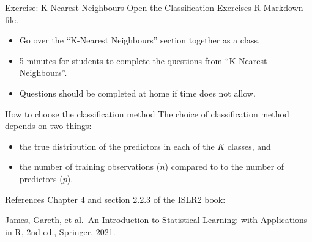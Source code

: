\documentclass[
  ignorenonframetext,
  aspectratio=169,
]{beamer}
\begin{document}
\begin{frame}{Exercise: K-Nearest Neighbours}
\protect\hypertarget{exercise-k-nearest-neighbours}{}
Open the Classification Exercises R Markdown file.

\begin{itemize}
\item
  Go over the ``K-Nearest Neighbours'' section together as a class.
\item
  5 minutes for students to complete the questions from ``K-Nearest
  Neighbours''.
\item
  Questions should be completed at home if time does not allow.
\end{itemize}
\end{frame}

\begin{frame}{How to choose the classification method}
\protect\hypertarget{how-to-choose-the-classification-method}{}
The choice of classification method depends on two things:

\begin{itemize}
\item
  the true distribution of the predictors in each of the \(K\) classes,
  and
\item
  the number of training observations (\(n\)) compared to to the number
  of predictors (\(p\)).
\end{itemize}
\end{frame}

\begin{frame}{References}
\protect\hypertarget{references}{}
Chapter 4 and section 2.2.3 of the ISLR2 book:

James, Gareth, et al.~An Introduction to Statistical Learning: with
Applications in R, 2nd ed., Springer, 2021.
\end{frame}
\end{document}
